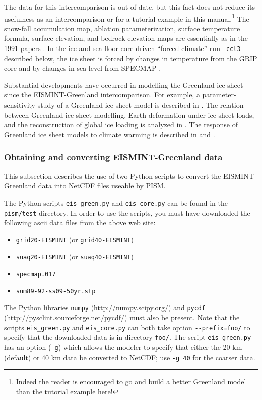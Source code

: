 \documentclass[11pt,final]{amsart}
\begin{document}
\centerline{}
\medskip

The data for this intercomparison is out of date, but this fact does not reduce its usefulness as an intercomparison or for a tutorial example in this manual.\footnote{Indeed the reader is encouraged to go and build a better Greenland model than the tutorial example here!}  The snow-fall accumulation map, ablation parameterization, surface temperature formula, surface elevation, and bedrock elevation maps are essentially as in the 1991 papers \cite{Letreguillyetal1991,OhmuraReeh}.  In the ice and sea floor-core driven ``forced climate'' run \verb|-ccl3| described below, the ice sheet is forced by changes in temperature from the GRIP core \cite{Dansgaardetal1993} and by changes in sea level from SPECMAP \cite{Imbrieetal1984}.  

Substantial developments have occurred in modelling the Greenland ice sheet since the EISMINT-Greenland intercomparison.  For example, a parameter-sensitivity study of a Greenland ice sheet model is described in \cite{RitzFabreLetreguilly}.  The relation between Greenland ice sheet modelling, Earth deformation under ice sheet loads, and the reconstruction of global ice loading is analyzed in \cite{TarasovPeltier}.  The response of Greenland ice sheet models to climate warming is described in \cite{HuybrechtsdeWolde} and \cite{Greve00}.



\subsubsection{Obtaining and converting EISMINT-Greenland data}  This subsection describes the use of two Python scripts to convert the EISMINT-Greenland data into NetCDF files useable by PISM.

The Python scripts \verb|eis_green.py| and \verb|eis_core.py| can be found in the \verb|pism/test| directory.  In order to use the scripts, you must have downloaded the following ascii data files from the above web site:\begin{itemize}
 \item \verb|grid20-EISMINT| (or \verb|grid40-EISMINT|)
 \item \verb|suaq20-EISMINT| (or \verb|suaq40-EISMINT|)
 \item \verb|specmap.017|
 \item \verb|sum89-92-ss09-50yr.stp|
\end{itemize}
The Python libraries \verb|numpy| (\url{http://numpy.scipy.org/}) and \verb|pycdf| (\url{http://pysclint.sourceforge.net/pycdf/}) must also be present.  Note that the scripts \verb|eis_green.py| and \verb|eis_core.py| can both take option \verb|--prefix=foo/| to specify that the downloaded data is in directory \verb|foo/|.  The script \verb|eis_green.py| has an option (\verb|-g|) which allows the modeler to specify that either the 20 km (default) or 40 km data be converted to NetCDF; use \verb|-g 40| for the coarser data.
\end{document}
